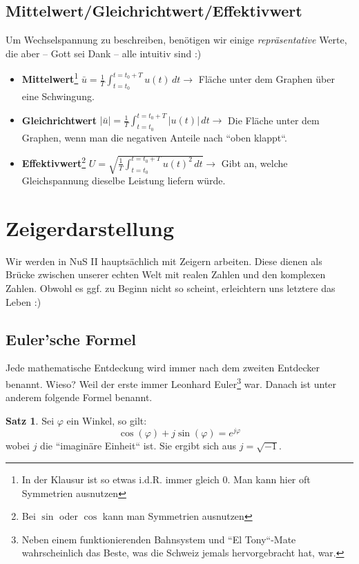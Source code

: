 \documentclass[11pt,a4paper]{article}
\begin{document}
\subsection{Mittelwert/Gleichrichtwert/Effektivwert}
Um Wechselspannung zu beschreiben, benötigen wir einige \textit{repräsentative} Werte, die aber – Gott sei Dank – alle intuitiv sind :)

\begin{itemize}
    \item \textbf{Mittelwert}\footnote{In der Klausur ist so etwas i.d.R. immer gleich 0. Man kann hier oft Symmetrien ausnutzen} \quad \( \bar{u} = \frac{1}{T} \int_{t=t_0}^{t=t_0+T} u(t) \, dt \rightarrow \) Fläche unter dem Graphen über eine Schwingung.
    
    \item \textbf{Gleichrichtwert} \quad \( |\bar{u}| = \frac{1}{T} \int_{t=t_0}^{t=t_0+T} |u(t)| \, dt \rightarrow \) Die Fläche unter dem Graphen, wenn man die negativen Anteile nach ``oben klappt``.
    
    \item \textbf{Effektivwert}\footnote{Bei \( \sin \) oder \( \cos \) kann man Symmetrien ausnutzen} \quad \( U = \sqrt{\frac{1}{T} \int_{t=t_0}^{t=t_0+T} u(t)^2 \, dt} \rightarrow \) Gibt an, welche Gleichspannung dieselbe Leistung liefern würde.
\end{itemize}


\section{Zeigerdarstellung}
Wir werden in NuS II hauptsächlich mit Zeigern arbeiten. Diese dienen als Brücke zwischen unserer echten Welt mit realen Zahlen und den komplexen Zahlen. Obwohl es ggf. zu Beginn nicht so scheint, erleichtern uns letztere das Leben :)

\subsection{Euler'sche Formel}
Jede mathematische Entdeckung wird immer nach dem zweiten Entdecker benannt. Wieso? Weil der erste immer Leonhard Euler\footnote{Neben einem funktionierenden Bahnsystem und ``El Tony``-Mate wahrscheinlich das Beste, was die Schweiz jemals hervorgebracht hat, war.} war. Danach ist unter anderem folgende Formel benannt.

\theoremstyle{definition}
\newtheorem*{definition}{Satz}
\begin{definition}
Sei \( \varphi \) ein Winkel, so gilt:
\[
\cos(\varphi) + j \sin(\varphi) = e^{j\varphi}
\]
wobei \( j \) die ``imaginäre Einheit`` ist. Sie ergibt sich aus \( j = \sqrt{-1} \).
\end{definition}
\end{document}
